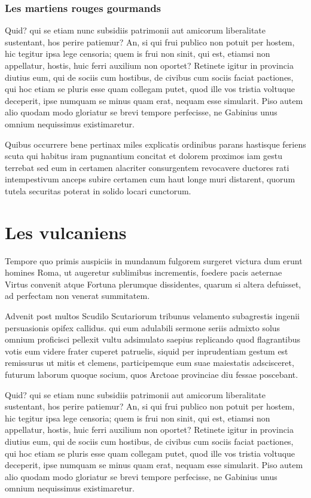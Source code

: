 \documentclass{framatexclass}
\begin{document}
\subsubsection{Les martiens rouges gourmands}
Quid? qui se etiam nunc subsidiis patrimonii aut amicorum liberalitate sustentant, hos perire patiemur? An, si qui frui publico non potuit per hostem, hic tegitur ipsa lege censoria; quem is frui non sinit, qui est, etiamsi non appellatur, hostis, huic ferri auxilium non oportet? Retinete igitur in provincia diutius eum, qui de sociis cum hostibus, de civibus cum sociis faciat pactiones, qui hoc etiam se pluris esse quam collegam putet, quod ille vos tristia voltuque deceperit, ipse numquam se minus quam erat, nequam esse simularit. Piso autem alio quodam modo gloriatur se brevi tempore perfecisse, ne Gabinius unus omnium nequissimus existimaretur.

Quibus occurrere bene pertinax miles explicatis ordinibus parans hastisque feriens scuta qui habitus iram pugnantium concitat et dolorem proximos iam gestu terrebat sed eum in certamen alacriter consurgentem revocavere ductores rati intempestivum anceps subire certamen cum haut longe muri distarent, quorum tutela securitas poterat in solido locari cunctorum.



\section{Les vulcaniens}
Tempore quo primis auspiciis in mundanum fulgorem surgeret victura dum erunt homines Roma, ut augeretur sublimibus incrementis, foedere pacis aeternae Virtus convenit atque Fortuna plerumque dissidentes, quarum si altera defuisset, ad perfectam non venerat summitatem.

Advenit post multos Scudilo Scutariorum tribunus velamento subagrestis ingenii persuasionis opifex callidus. qui eum adulabili sermone seriis admixto solus omnium proficisci pellexit vultu adsimulato saepius replicando quod flagrantibus votis eum videre frater cuperet patruelis, siquid per inprudentiam gestum est remissurus ut mitis et clemens, participemque eum suae maiestatis adscisceret, futurum laborum quoque socium, quos Arctoae provinciae diu fessae poscebant.

Quid? qui se etiam nunc subsidiis patrimonii aut amicorum liberalitate sustentant, hos perire patiemur? An, si qui frui publico non potuit per hostem, hic tegitur ipsa lege censoria; quem is frui non sinit, qui est, etiamsi non appellatur, hostis, huic ferri auxilium non oportet? Retinete igitur in provincia diutius eum, qui de sociis cum hostibus, de civibus cum sociis faciat pactiones, qui hoc etiam se pluris esse quam collegam putet, quod ille vos tristia voltuque deceperit, ipse numquam se minus quam erat, nequam esse simularit. Piso autem alio quodam modo gloriatur se brevi tempore perfecisse, ne Gabinius unus omnium nequissimus existimaretur.
\end{document}
